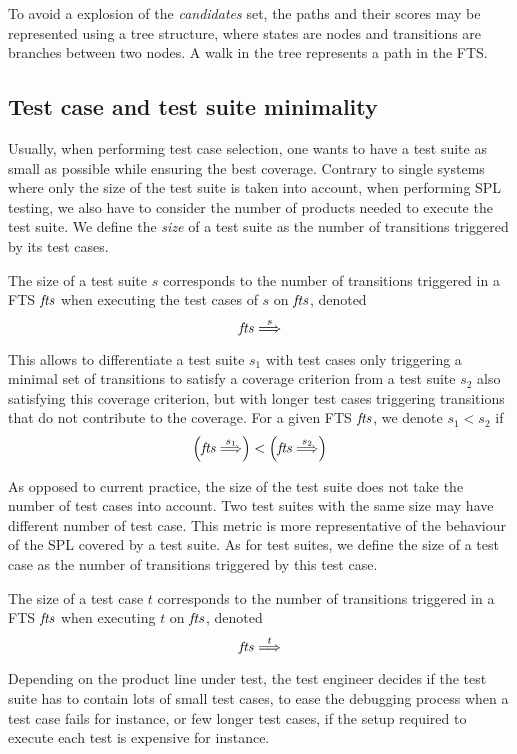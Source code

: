 To avoid a explosion of the \textit{candidates} set, the paths and their scores may be represented using a tree structure, where states are nodes and transitions are branches between two nodes. A walk in the tree represents a path in the FTS.


\subsection{Test case and test suite minimality}

Usually, when performing test case selection, one wants to have a test suite as small as possible while ensuring the best coverage. Contrary to single systems where only the size of the test suite is taken into account, when performing SPL testing, we also have to consider the number of products needed to execute the test suite. We define the \emph{size} of a test suite as the number of transitions triggered by its test cases.

\begin{definition}
The size of a test suite $s$ corresponds to the number of transitions triggered in a FTS $\mathit{fts}$ when executing the test cases of $s$ on $\mathit{fts}$, denoted 
$$\mathit{fts} \overset{s}{\Longrightarrow}$$
\end{definition}
%
This allows to differentiate a test suite $s_1$ with test cases only triggering a minimal set of transitions to satisfy a coverage criterion from a test suite $s_2$ also satisfying this coverage criterion, but with longer test cases triggering transitions that do not contribute to the coverage. For a given FTS $\mathit{fts}$, we denote $s_1 < s_2$ if 
$$\left( \mathit{fts} \overset{s_1}{\Longrightarrow} \right) < \left( \mathit{fts} \overset{s_2}{\Longrightarrow} \right)$$

As opposed to current practice, the size of the test suite does not take the number of test cases into account. Two test suites with the same size may have different number of test case. This metric is more representative of the behaviour of the SPL covered by a test suite. As for test suites, we define the size of a test case as the number of transitions triggered by this test case.

\begin{definition}
The size of a test case $t$ corresponds to the number of transitions triggered in a FTS $\mathit{fts}$ when executing $t$ on $\mathit{fts}$, denoted 
$$\mathit{fts} \overset{t}{\Longrightarrow}$$
\end{definition}
%
Depending on the product line under test, the test engineer decides if the test suite has to contain lots of small test cases, to ease the debugging process when a test case fails for instance, or few longer test cases, if the setup required to execute each test is expensive for instance.

